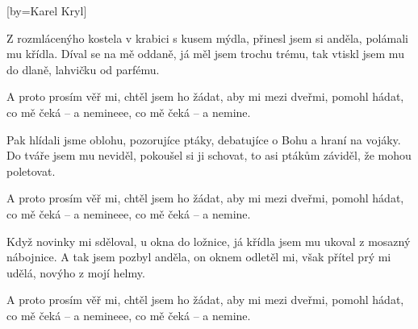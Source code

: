 [by={Karel Kryl}]

\beginverse{}
Z rozmlácenýho kostela v krabici s kusem mýdla,
přinesl jsem si anděla, polámali mu křídla.
Díval se na mě oddaně, já měl jsem trochu trému,
tak vtiskl jsem mu do dlaně, lahvičku od parfému.
\endverse{}

\beginchorus{}
A proto prosím věř mi, chtěl jsem ho žádat,
aby mi mezi dveřmi, pomohl hádat,
co mě čeká -- a nemineee,
co mě čeká -- a nemine. 
\endchorus{}

\beginverse{}
Pak hlídali jsme oblohu, pozorujíce ptáky,
debatujíce o Bohu a hraní na vojáky.
Do tváře jsem mu neviděl, pokoušel si ji schovat,
to asi ptákům záviděl, že mohou poletovat.
\endverse{}

\beginchorus{}
A proto prosím věř mi, chtěl jsem ho žádat,
aby mi mezi dveřmi, pomohl hádat,
co mě čeká -- a nemineee,
co mě čeká -- a nemine. 
\endchorus{}

\beginverse{}
Když novinky mi sděloval, u okna do ložnice,
já křídla jsem mu ukoval z mosazný nábojnice.
A tak jsem pozbyl anděla, on oknem odletěl mi,
však přítel prý mi udělá, novýho z mojí helmy.
\endverse{}

\beginchorus{}
A proto prosím věř mi, chtěl jsem ho žádat,
aby mi mezi dveřmi, pomohl hádat,
co mě čeká -- a nemineee,
co mě čeká --  a nemine.
\endchorus{}

\endsong{}
